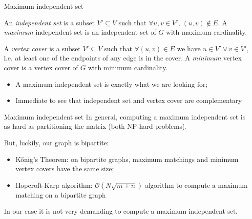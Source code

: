 \begin{frame}{Maximum independent set}
 \begin{definition}
		An \emph{independent set} is a subset $V' \subseteq V$ such that $ \forall u,v \in V'$, $(u,v) \notin E$.
	A \emph{maximum} independent set is an independent set of $G$ with maximum cardinality. 
 \end{definition}

 \begin{definition}
 	A \emph{vertex cover} is a subset $V' \subseteq V$ such that $\forall (u,v) \in E$ we have $u \in V' \vee v \in V'$, i.e. at least one of the endpoints of any edge is in the cover. A \emph{minimum} vertex cover is a vertex cover of $G$ with minimum cardinality.
\end{definition}

\begin{itemize}
	\item A maximum independent set is exactly what we are looking for;
	\item Immediate to see that independent set and vertex cover are complementary
\end{itemize}

\end{frame}

\begin{frame}{Maximum independent set}
	In general, computing a maximum independent set is as hard as partitioning the matrix (both NP-hard problems).

But, luckily, our graph is bipartite:

	\begin{itemize}
		\item K\H{o}nig's Theorem: on bipartite graphs, maximum matchings and minimum vertex covers have the same size;
		\item Hopcroft-Karp algorithm: $\mathcal{O}\left(N\sqrt{m+n}\right)$ algorithm to compute a maximum matching on a bipartite graph
	\end{itemize}

In our case it is not very demanding to compute a maximum independent set.

\end{frame}

